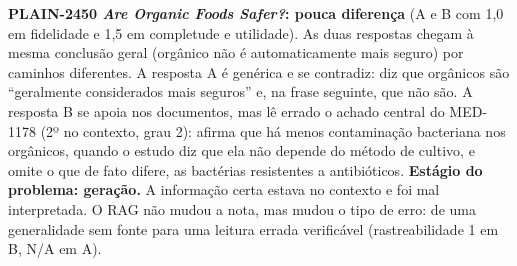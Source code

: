 \documentclass[10pt,a4paper]{article}
\newcommand{\med}[1]{\mbox{MED-#1}}         %
\newcommand{\pq}[1]{\mbox{PLAIN-#1}}        %
\begin{document}
\textbf{\pq{2450} \emph{Are Organic Foods Safer?}: pouca diferença} (A e B com 1,0 em fidelidade e 1,5 em completude e utilidade). As duas respostas chegam à mesma conclusão geral (orgânico não é automaticamente mais seguro) por caminhos diferentes. A resposta A é genérica e se contradiz: diz que orgânicos são ``geralmente considerados mais seguros'' e, na frase seguinte, que não são. A resposta B se apoia nos documentos, mas lê errado o achado central do \med{1178} (2º no contexto, grau 2): afirma que há menos contaminação bacteriana nos orgânicos, quando o estudo diz que ela não depende do método de cultivo, e omite o que de fato difere, as bactérias resistentes a antibióticos. \textbf{Estágio do problema: geração.} A informação certa estava no contexto e foi mal interpretada. O RAG não mudou a nota, mas mudou o tipo de erro: de uma generalidade sem fonte para uma leitura errada verificável (rastreabilidade 1 em B, N/A em A).
\end{document}
